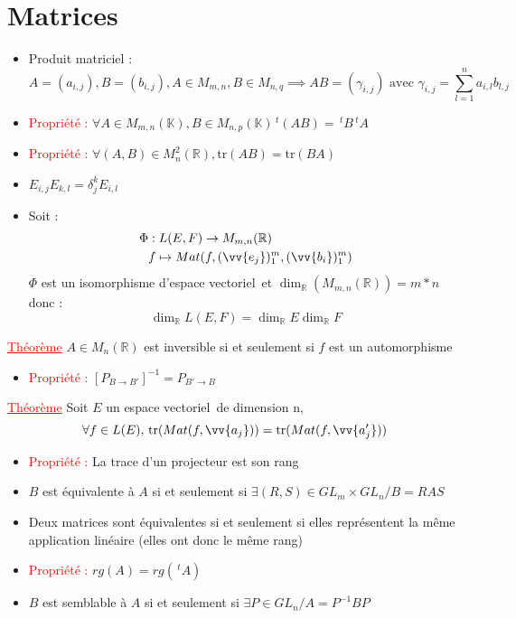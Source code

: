 \documentclass[a4paper, french]{article}
\newcommand{\R}{\mathbb{R}}
\newcommand{\K}{\mathbb{K}}
\newcommand{\tr}{\mathrm{tr}}
\newcommand{\ev}{espace vectoriel}
\newcommand{\de}{\delta}
\newcommand{\som}[2]{\overset{#2}{\underset{#1}{\sum}}}
\newcommand{\thm}{\textcolor{red}{\underline{Théorème} }}
\newcommand{\ppt}{\textcolor{red}{Propriété : }}
\begin{document}
	\section{Matrices}
	\begin{itemize}[label=\(\bullet\)]
 		\item Produit matriciel :
			$$A=(a_{i,j}),B=(b_{i,j}), A\in M_{m,n}, B \in M_{n,q} \implies AB=(\gamma_{i,j}) \text{ avec } \gamma_{i,j}=\som{l=1}{n}a_{i,l}b_{l,j}$$
 		\item \ppt $\forall A \in M_{m,n}(\K), B \in M_{n,p}(\K) \, ^t(AB)=\, ^tB\, ^tA$
 		\item \ppt $\forall (A,B) \in M_n^2(\R), \tr(AB)=\tr(BA)$
 		\item $E_{i,j}E_{k,l}= \de_j^kE_{i,l}$
 		\item Soit :
			\begin{align*}
				\Phi &: L(E,F) \rightarrow M_{m,n}(\R) \\
				      &f \mapsto Mat(f,(\vv{e_j})_1^m,(\vv{b_i})_1^m)
			\end{align*}
			$\Phi$ est un isomorphisme d'\ev \, et $\dim_{\R}(M_{m,n}(\R))=m*n$ donc : $$\dim_{\R}L(E,F)=\dim_{\R}E \dim_{\R}F$$
	\end{itemize}

	 \thm $A\in M_n(\R)$ est inversible si et seulement si $f$ est un automorphisme

	\begin{itemize}[label=\(\bullet\)]
 		\item\ppt $[P_{B\rightarrow B'}]^{-1}=P_{B'\rightarrow B}$
	\end{itemize}

	 \thm Soit $E$ un \ev \, de dimension n, $$\forall f \in L(E), \, \tr(Mat(f,\vv{a_j}))=\tr(Mat(f,\vv{a'_j}))$$
	
	 \begin{itemize}[label=\(\bullet\)]
 		\item \ppt La trace d'un projecteur est son rang
 		\item $B$ est équivalente à $A$ si et seulement si $\exists (R,S) \in GL_m \times GL_n / B=RAS$
 		\item Deux matrices sont équivalentes si et seulement si elles représentent la même application linéaire (elles ont donc le même rang)
 		\item \ppt $rg(A)=rg(\,^tA)$
 		\item $B$ est semblable à $A$ si et seulement si $\exists P \in GL_n / A=P^{-1}BP$
	\end{itemize}
\end{document}
